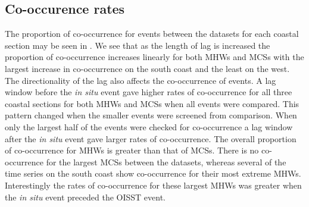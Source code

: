 \documentclass[a4paper,10pt,review]{elsarticle}
\begin{document}
\subsection{Co-occurence rates}
The proportion of co-occurrence for events between the datasets for each coastal section may be seen in . We see that as the length of lag is increased the proportion of co-occurrence increases linearly for both MHWs and MCSs with the largest increase in co-occurrence on the south coast and the least on the west. The directionality of the lag also affects the co-occurrence of events. A lag window before the \emph{in situ} event gave higher rates of co-occurrence for all three coastal sections for both MHWs and MCSs when all events were compared. This pattern changed when the smaller events were screened from comparison. When only the largest half of the events were checked for co-occurrence a lag window after the \emph{in situ} event gave larger rates of co-occurrence. The overall proportion of co-occurrence for MHWs is greater than that of MCSs. There is no co-occurrence for the largest MCSs between the datasets, whereas several of the time series on the south coast show co-occurrence for their most extreme MHWs. Interestingly the rates of co-occurrence for these largest MHWs was greater when the \emph{in situ} event preceded the OISST event.
\end{document}

